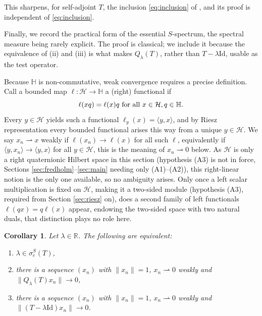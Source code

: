 \documentclass[12pt,a4paper]{article}
\theoremstyle{plain}
\newtheorem{corollary}[theorem]{Corollary}
\theoremstyle{definition}
\theoremstyle{remark}
\newcommand{\HH}{\mathbb H}
\newcommand{\RR}{\mathbb R}
\newcommand{\Id}{\mathrm{Id}}
\newcommand{\HS}{\mathcal H}
\newcommand{\sigeS}{\sigma_{e}^{S}}
\begin{document}
{This sharpens, for self-adjoint $T$, the inclusion \eqref{eq:inclusion}
of \cite[Corollary 3.11]{BaloudiBelgacemJeribi2022}, and its proof is
independent of \eqref{eq:inclusion}.

Finally, we record the practical form of the essential $S$-spectrum,
the spectral measure being rarely explicit. The proof is classical; we
include it because the equivalence of (ii) and (iii) is what makes
$Q_\lambda(T)$, rather than $T-\lambda\Id$, usable as the test
operator.

Because $\HH$ is non-commutative, weak convergence requires a precise
definition. Call a bounded map $\ell:\HS\to\HH$ a (right)
functional if $$\ell(xq)=\ell(x)q \hbox{ for all } x\in\HS, q\in\HH.$$ Every
$y\in\HS$ yields such a functional $\ell_y(x)=\langle y,x\rangle$, and
by Riesz representation \cite{GhiloniMorettiPerotti2013} every bounded
functional arises this way from a unique $y\in\HS$.
 We say
$x_n\rightharpoonup x$ weakly if $\ell(x_n)\to\ell(x)$ for all
such $\ell$, equivalently if $\langle y,x_n\rangle\to\langle y,x\rangle$
for all $y\in\HS$, this is the meaning of $x_n\rightharpoonup0$ below.
As $\HS$ is only a right quaternionic Hilbert space in this section
(hypothesis (A3) is not in force, Sections
\ref{sec:fredholm}--\ref{sec:main} needing only (A1)--(A2)), this
right-linear notion is the only one available, so no ambiguity arises.
Only once a left scalar multiplication is fixed on $\HS$, making it a
two-sided module (hypothesis (A3), required from Section
\ref{sec:riesz} on), does a second family of left functionals
$\ell(qx)=q\ell(x)$ appear, endowing the two-sided space with two
natural duals, that distinction plays no role here.

\begin{corollary}
\label{thm:weyl-criterion}
Let $\lambda\in\RR$. The following are equivalent:
\begin{enumerate}[label=(\roman*),leftmargin=2.4em]
\item $\lambda\in\sigeS(T)$,
\item there is a sequence $(x_n)$ with $\|x_n\|=1$,
$x_n\rightharpoonup0$ weakly and $\|Q_\lambda(T)x_n\|\to0$,
\item there is a sequence $(x_n)$ with $\|x_n\|=1$,
$x_n\rightharpoonup0$ weakly and $\|(T-\lambda\Id)x_n\|\to0$.
\end{enumerate}
\end{corollary}


}
\end{document}
